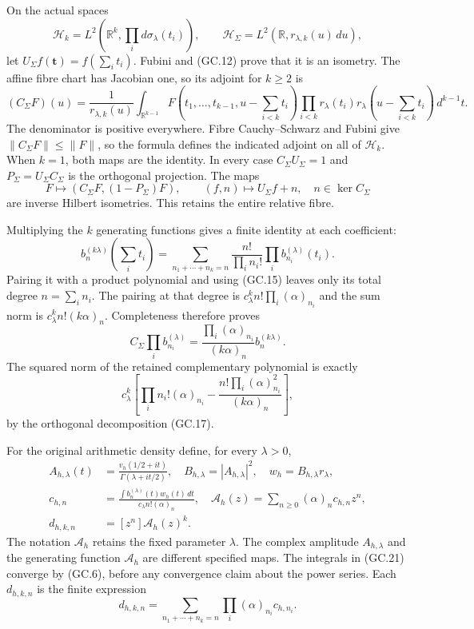 \documentclass[11pt]{article}
\begin{document}
On the actual spaces
\[
 \mathcal H_k=L^2(\mathbb R^k,\prod_i d\sigma_\lambda(t_i)),
 \qquad\mathcal H_\Sigma=L^2(\mathbb R,r_{\lambda,k}(u)\,du),
\]
let $U_\Sigma f(\mathbf t)=f(\sum_i t_i)$. Fubini and (GC.12)
prove that it is an isometry. The affine fibre chart has Jacobian one,
so its adjoint for $k\ge2$ is
\[
 (C_\Sigma F)(u)=\frac1{r_{\lambda,k}(u)}
 \int_{\mathbb R^{k-1}}F(t_1,\ldots,t_{k-1},u-\sum_{i<k}t_i)
 \prod_{i<k}r_\lambda(t_i)r_\lambda(u-\sum_{i<k}t_i)
 \,d^{k-1}t.                                                  \tag{GC.16}
\]
The denominator is positive everywhere. Fibre Cauchy--Schwarz and
Fubini give $\|C_\Sigma F\|\le\|F\|$, so the formula defines
the indicated adjoint on all of $\mathcal H_k$. When $k=1$, both
maps are the identity. In every case $C_\Sigma U_\Sigma=1$ and
$P_\Sigma=U_\Sigma C_\Sigma$ is the orthogonal projection. The maps
\[
 F\mapsto(C_\Sigma F,(1-P_\Sigma)F),\qquad
 (f,n)\mapsto U_\Sigma f+n,\quad n\in\ker C_\Sigma              \tag{GC.17}
\]
are inverse Hilbert isometries. This retains the entire relative fibre.

Multiplying the $k$ generating functions gives a finite identity at
each coefficient:
\[
 b_n^{(k\lambda)}(\sum_i t_i)=
 \sum_{n_1+\cdots+n_k=n}\frac{n!}{\prod_i n_i!}
                    \prod_i b_{n_i}^{(\lambda)}(t_i).
                                                               \tag{GC.18}
\]
Pairing it with a product polynomial and using (GC.15) leaves only
its total degree $n=\sum_i n_i$. The pairing at that degree is
$c_\lambda^k n!\prod_i(\alpha)_{n_i}$ and the sum norm is
$c_\lambda^k n!(k\alpha)_n$. Completeness therefore proves
\[
 C_\Sigma\prod_i b_{n_i}^{(\lambda)}
   =\frac{\prod_i(\alpha)_{n_i}}{(k\alpha)_n}b_n^{(k\lambda)}.
                                                               \tag{GC.19}
\]
The squared norm of the retained complementary polynomial is exactly
\[
 c_\lambda^k\left[
  \prod_i n_i!(\alpha)_{n_i}
  -\frac{n!\prod_i(\alpha)_{n_i}^2}{(k\alpha)_n}\right],
                                                               \tag{GC.20}
\]
by the orthogonal decomposition (GC.17).

For the original arithmetic density define, for every $\lambda>0$,
\[
 \begin{split}
 A_{h,\lambda}(t)&=\frac{v_h(1/2+it)}{\Gamma(\lambda+it/2)},
 \quad B_{h,\lambda}=|A_{h,\lambda}|^2,
 \quad w_h=B_{h,\lambda}r_\lambda,\\
 c_{h,n}&=\frac{\int b_n^{(\lambda)}(t)w_h(t)\,dt}
                 {c_\lambda n!(\alpha)_n},
 \quad\mathcal A_h(z)=\sum_{n\ge0}(\alpha)_nc_{h,n}z^n,\\
 d_{h,k,n}&=[z^n]\mathcal A_h(z)^k.
 \end{split}                                                   \tag{GC.21}
\]
The notation $\mathcal A_h$ retains the fixed parameter $\lambda$.
The complex amplitude $A_{h,\lambda}$ and the generating function
$\mathcal A_h$ are different specified maps. The integrals in
(GC.21) converge by (GC.6), before any convergence claim about the
power series. Each $d_{h,k,n}$ is the finite expression
\[
 d_{h,k,n}=\sum_{n_1+\cdots+n_k=n}
                   \prod_i(\alpha)_{n_i}c_{h,n_i}.             \tag{GC.22}
\]
\end{document}
